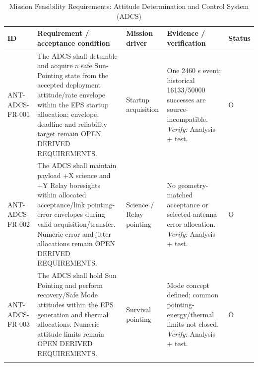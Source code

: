 \begin{table}[H]\centering\small\setlength{\tabcolsep}{3pt}
\caption{Mission Feasibility Requirements: Attitude Determination and Control System (ADCS)}\label{tab:fr-adcs}
\begin{tabular}{@{}
>{\RaggedRight\arraybackslash}p{}
>{\RaggedRight\arraybackslash}p{}
>{\RaggedRight\arraybackslash}p{}
>{\RaggedRight\arraybackslash}p{}
>{\RaggedRight\arraybackslash}p{}
@{}}
\toprule ID & Requirement / acceptance condition & Mission driver & Evidence / verification & Status\\\midrule
{}\label{req:ANT-ADCS-FR-001}\mbox{ANT-ADCS-}\newline\mbox{FR-001} & The ADCS shall detumble and acquire a safe Sun-Pointing state from the accepted deployment attitude/rate envelope within the EPS startup allocation; envelope, deadline and reliability target remain OPEN DERIVED REQUIREMENTS. & Startup acquisition & One 2460 s event; historical 16133/50000 successes are source-incompatible. \emph{Verify:} Analysis + test. & O\\
\addlinespace[3pt]
\label{req:ANT-ADCS-FR-002}\mbox{ANT-ADCS-}\newline\mbox{FR-002} & The ADCS shall maintain payload +X science and +Y Relay boresights within allocated acceptance/link pointing-error envelopes during valid acquisition/transfer. Numeric error and jitter allocations remain OPEN DERIVED REQUIREMENTS. & Science / Relay pointing & No geometry-matched acceptance or selected-antenna error allocation. \emph{Verify:} Analysis + test. & O\\
\addlinespace[3pt]
\label{req:ANT-ADCS-FR-003}\mbox{ANT-ADCS-}\newline\mbox{FR-003} & The ADCS shall hold Sun Pointing and perform recovery/Safe Mode attitudes within the EPS generation and thermal allocations. Numeric attitude limits remain OPEN DERIVED REQUIREMENTS. & Survival pointing & Mode concept defined; common pointing-energy/thermal limits not closed. \emph{Verify:} Analysis + test. & O\\
\addlinespace[3pt]
\bottomrule
\end{tabular}
\end{table}
